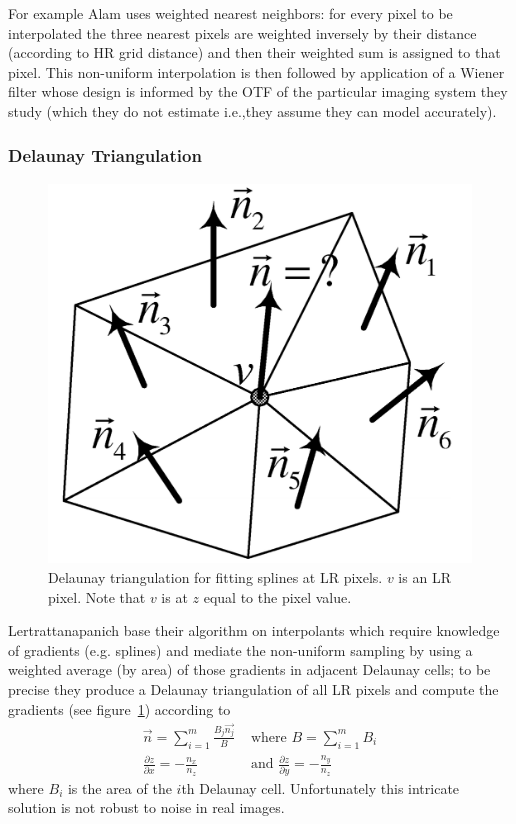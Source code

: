 For example Alam \cite{Alam2000} uses weighted nearest neighbors: for every pixel to be interpolated the three nearest pixels are weighted inversely by their distance (according to HR grid distance) and then their weighted sum is assigned to that pixel.
%
This non-uniform interpolation is then followed by application of a Wiener filter whose design is informed by the OTF of the particular imaging system they study (which they do not estimate i.e.,they assume they can model accurately).
%
\subsubsection{Delaunay Triangulation}

\begin{figure}
	\centering
	\includegraphics[width=.7\linewidth]{figures/classical/delauney.png}
	\caption{Delaunay triangulation for fitting splines at LR pixels\cite{Lertrattanapanich}. \(v\) is an LR pixel. Note that \(v\) is at \(z\) equal to the pixel value.}
	\label{fig:delauney}
\end{figure}
Lertrattanapanich \cite{Lertrattanapanich} base their algorithm on interpolants which require knowledge of gradients (e.g. splines) and mediate the non-uniform sampling by using a weighted average (by area) of those gradients in adjacent Delaunay cells; to be precise they produce a Delaunay triangulation of all LR pixels and compute the gradients (see figure~\ref{fig:delauney}) according to
\begin{align*}
	\vec{n} = \sum_{i=1}^m \frac{B_j \vec{n_j}}{B}   & \text{ where } B=\sum_{i=1}^m B_i                              \\
	\frac{\partial z}{\partial x} = -\frac{n_x}{n_z} & \text{ and }  \frac{\partial z}{\partial y} = -\frac{n_y}{n_z}
\end{align*}
where \(B_i\) is the area of the \(i\)th Delaunay cell.
%
Unfortunately this intricate solution is not robust to noise in real images.
